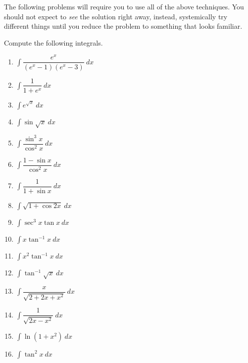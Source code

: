  The following problems will require you to use all of the above techniques. You should not expect to {\it see} the solution right away, instead, systemically try different things until you reduce the problem to something that looks familiar.

\begin{exercise}
	Compute the following integrals.
	\begin{multicols}{2}
		\begin{enumerate}
			\item $\int \dfrac{e^x}{(e^x - 1)(e^x - 3)}\: dx$
			\item $\int \dfrac{1}{1 + e^x} \: dx$
			\item $\int e^{\sqrt{x}} \: dx$
			\item $\int \sin \sqrt{x}\: dx$
			\item $\int \dfrac{\sin^3 x}{\cos^2 x} \: dx$
			\item $\int \dfrac{1 - \sin x}{\cos^2 x}\: dx$
			\item $\int \dfrac{1}{1 + \sin x}\: dx$
			\item $\int \sqrt{1 + \cos 2x}\: dx$
			\item $\int \sec^3 x \tan x\: dx$
			\item $\int x \tan^{-1} x\: dx$
			\item $\int x^2 \tan^{-1} x\: dx$
			\item $\int \tan^{-1} {\sqrt{x}}\: dx$
			\item $\int \dfrac{x}{\sqrt{2 + 2x + x^2}} \: dx$
			\item $\int \dfrac{1}{\sqrt{2x - x^2}}\: dx$
			\item $\int \ln(1 + x^2)\: dx$
			\item $\int \tan^{2} x\: dx$
		\end{enumerate}
	\end{multicols}
\end{exercise}
